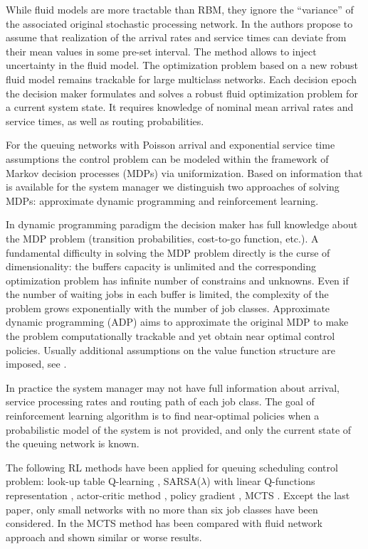 \documentclass[11pt]{article}
\theoremstyle{definition}
\numberwithin{equation}{section}
\begin{document}
 While fluid models are more tractable than RBM, they ignore the ``variance'' of the associated original stochastic processing network.   In \cite{Bertsimas2015} the authors propose to assume that realization
of the arrival rates and service times can deviate from their mean values in some pre-set interval. The method allows to inject uncertainty in the fluid model. The optimization problem  based on a new robust fluid model remains trackable for large multiclass networks. Each decision epoch the decision maker formulates and solves a robust fluid optimization problem for a current system state. It requires knowledge of nominal mean arrival rates and service times, as well as routing probabilities.


 For the queuing networks with Poisson arrival and exponential service time assumptions the control problem can be modeled within the framework of Markov decision processes (MDPs) via uniformization.   Based on information that is available for the system manager we distinguish two approaches of solving MDPs: approximate dynamic programming and reinforcement learning.


 In dynamic programming paradigm the decision maker has full knowledge about the MDP problem (transition probabilities, cost-to-go function, etc.).
 A fundamental difficulty in solving the MDP problem directly  is the curse of dimensionality: the buffers capacity is unlimited and the corresponding optimization
problem has infinite number of constrains and unknowns. Even if the number of waiting jobs in each buffer is limited, the
complexity of the problem grows exponentially with the number of job classes. Approximate dynamic programming (ADP)  aims to approximate the original MDP to make the problem computationally trackable and yet obtain near optimal control policies. Usually additional assumptions on the value function structure are imposed, see \cite{DeFarias2003a, Abbasi_Yadkori2014a, Veatch2015}.

In practice the system manager may not have full information about arrival, service processing rates and routing path of each job class. The goal of  reinforcement learning algorithm is to find near-optimal  policies when a probabilistic model of the system is not provided, and only the current state of the queuing network is known. %


The following RL methods have been applied for queuing scheduling control problem: look-up table Q-learning \cite{Ramirez-Hernandez}, SARSA($\lambda$) with linear Q-functions representation \cite{Ramirez-Hernandez2007a},  actor-critic method \cite{Ramirez-Hernandez2007c}, policy gradient \cite{Paschalidis2004}, MCTS \cite{Bertsimas2017}. Except the last paper, only small networks with no more than six job classes have been considered. In \cite{Bertsimas2017} the MCTS method has been compared with fluid network approach \cite{Bertsimas2015} and shown similar or worse results.
\end{document}
